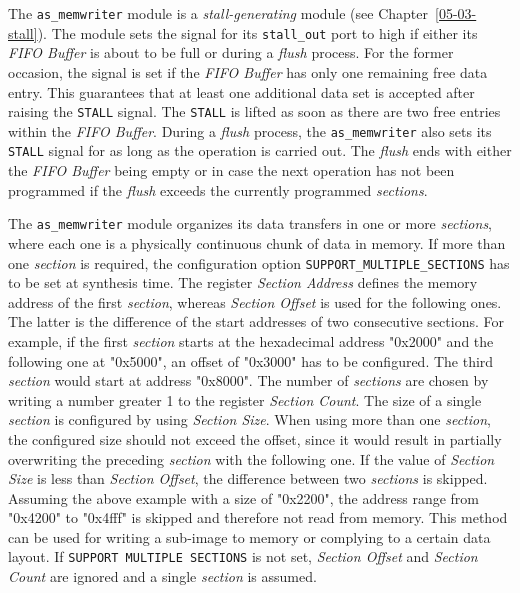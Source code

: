 The \texttt{as\_memwriter} module is a \textit{stall-generating} module (see Chapter~\ref{05-03-stall}).
The module sets the signal for its \texttt{stall\_out} port to high if either its \textit{FIFO Buffer} is about to be full or during a \textit{flush} process.
For the former occasion, the signal is set if the \textit{FIFO Buffer} has only one remaining free data entry.
This guarantees that at least one additional data set is accepted after raising the \texttt{STALL} signal.
The \texttt{STALL} is lifted as soon as there are two free entries within the \textit{FIFO Buffer}.
During a \textit{flush} process, the \texttt{as\_memwriter} also sets its \texttt{STALL} signal for as long as the operation is carried out.
The \textit{flush} ends with either the \textit{FIFO Buffer} being empty or in case the next operation has not been programmed if the \textit{flush} exceeds the currently programmed \textit{sections}.


The \texttt{as\_memwriter} module organizes its data transfers in one or more \textit{sections}, where each one is a physically continuous chunk of data in memory.
If more than one \textit{section} is required, the configuration option \texttt{SUPPORT\_MULTIPLE\_SECTIONS} has to be set at synthesis time.
The register \textit{Section Address} defines the memory address of the first \textit{section}, whereas \textit{Section Offset} is used for the following ones.
The latter is the difference of the start addresses of two consecutive sections.
For example, if the first \textit{section} starts at the hexadecimal address "0x2000" and the following one at "0x5000", an offset of "0x3000" has to be configured.
The third \textit{section} would start at address "0x8000".
The number of \textit{sections} are chosen by writing a number greater 1 to the register \textit{Section Count}.
The size of a single \textit{section} is configured by using \textit{Section Size}.
When using more than one \textit{section}, the configured size should not exceed the offset, since it would result in partially overwriting the preceding \textit{section} with the following one.
If the value of \textit{Section Size} is less than \textit{Section Offset}, the difference between two \textit{sections} is skipped.
Assuming the above example with a size of "0x2200", the address range from "0x4200" to "0x4fff" is skipped and therefore not read from memory.
This method can be used for writing a sub-image to memory or complying to a certain data layout.
If \texttt{SUPPORT\ MULTIPLE\ SECTIONS} is not set, \textit{Section Offset} and \textit{Section Count} are ignored and a single \textit{section} is assumed.


